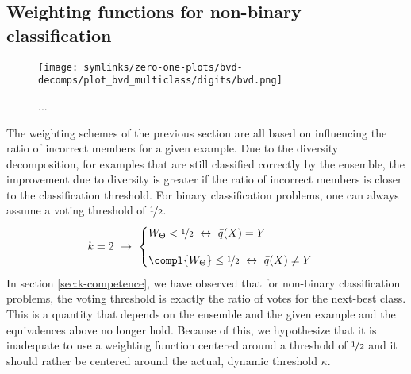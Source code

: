 \documentclass[../main.tex]{subfiles}
\begin{document}



\subsection{Weighting functions for non-binary classification}

\begin{figure*}
    \texttt{[image: symlinks/zero-one-plots/bvd-decomps/plot\_bvd\_multiclass/digits/bvd.png]}
    \caption{
        ...
    }
\end{figure*}

The weighting schemes of the previous section are all based on influencing the ratio of incorrect members for a given example. Due to the diversity decomposition, for examples that are still classified correctly by the ensemble, the improvement due to diversity is greater if the ratio of incorrect members is closer to the classification threshold.
For binary classification problems, one can always assume a voting threshold of $\nicefrac{1}{2}$. 
\begin{align}
k = 2 ~\rightarrow~ 
\begin{cases}
W_{\Theta}  < \nicefrac{1}{2} ~\leftrightarrow~  \bar{q}(X) = Y \\[1em]
\compl{W_\Theta }  \leq \nicefrac{1}{2} ~\leftrightarrow~ \bar{q}(X) \not= Y
\end{cases}
\end{align}
In section \ref{sec:k-competence}, we have observed that for non-binary classification problems, the voting threshold is exactly the ratio of votes for the next-best class. This is a quantity that depends on the ensemble and the given example and the equivalences above no longer hold. Because of this, we hypothesize that it is inadequate to use a weighting function centered around a threshold of $\nicefrac{1}{2}$ and it should rather be centered around the actual, dynamic threshold $\kappa$.
\end{document}
